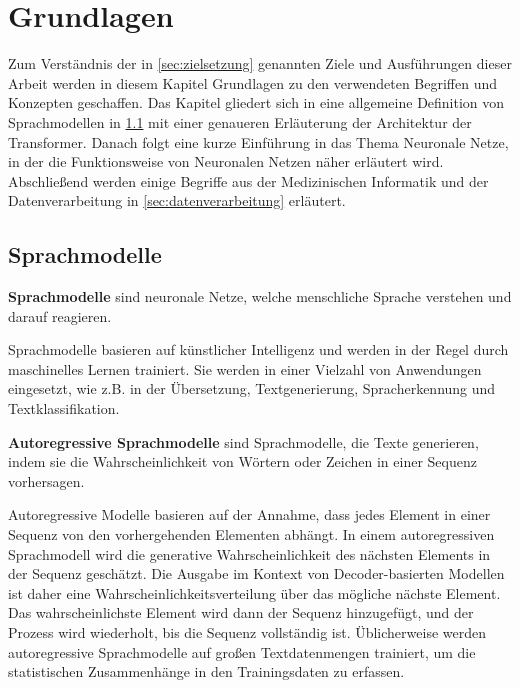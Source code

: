 \chapter{Grundlagen}\label{ch:preliminaries}
Zum Verständnis der in \cref{sec:zielsetzung} genannten Ziele und Ausführungen dieser Arbeit werden in diesem Kapitel Grundlagen zu den verwendeten Begriffen und Konzepten geschaffen.
Das Kapitel gliedert sich in eine allgemeine Definition von Sprachmodellen in \cref{sec:sprachmodelle} mit einer genaueren Erläuterung der Architektur der Transformer.
Danach folgt eine kurze Einführung in das Thema Neuronale Netze, in der die Funktionsweise von Neuronalen Netzen näher erläutert wird.
Abschließend werden einige Begriffe aus der Medizinischen Informatik und der Datenverarbeitung in \cref{sec:datenverarbeitung} erläutert.

\section{Sprachmodelle}\label{sec:sprachmodelle}

\begin{definition}\label{def:sprachmodell}
    \textbf{Sprachmodelle} sind neuronale Netze, welche menschliche Sprache verstehen und darauf reagieren.
\end{definition}
Sprachmodelle basieren auf künstlicher Intelligenz und werden in der Regel durch maschinelles Lernen trainiert.
Sie werden in einer Vielzahl von Anwendungen eingesetzt, wie z.B. in der Übersetzung,
Textgenerierung, Spracherkennung und Textklassifikation.

\begin{definition}\label{def:autoregressive-sprachmodelle}
    \textbf{Autoregressive Sprachmodelle} sind Sprachmodelle, die Texte generieren,
    indem sie die Wahrscheinlichkeit von Wörtern oder Zeichen in einer Sequenz vorhersagen.
\end{definition}

Autoregressive Modelle basieren auf der Annahme, dass jedes Element in einer Sequenz von den vorhergehenden Elementen abhängt.
In einem autoregressiven Sprachmodell wird die generative Wahrscheinlichkeit des nächsten Elements in der Sequenz geschätzt.
Die Ausgabe im Kontext von Decoder-basierten Modellen ist daher eine Wahrscheinlichkeitsverteilung über das mögliche nächste Element.
Das wahrscheinlichste Element wird dann der Sequenz hinzugefügt, und der Prozess wird wiederholt, bis die Sequenz vollständig ist.
Üblicherweise werden autoregressive Sprachmodelle auf großen Textdatenmengen trainiert, um die statistischen Zusammenhänge in den Trainingsdaten zu erfassen.

